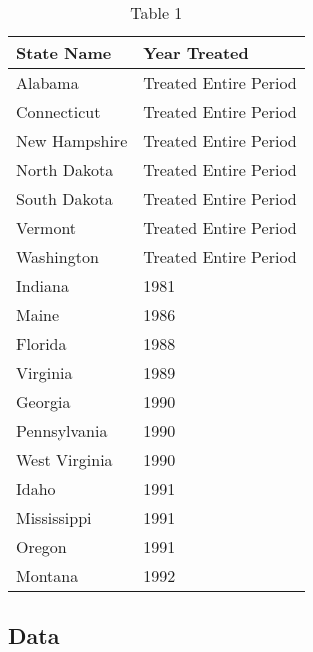 \documentclass[
]{article}
\begin{document}
\begin{table}

\caption{\label{tab:unnamed-chunk-3}Table 1}
\centering
\begin{tabular}[t]{l|l}
\hline
State Name & Year Treated\\
\hline
Alabama & Treated Entire Period\\
\hline
Connecticut & Treated Entire Period\\
\hline
New Hampshire & Treated Entire Period\\
\hline
North Dakota & Treated Entire Period\\
\hline
South Dakota & Treated Entire Period\\
\hline
Vermont & Treated Entire Period\\
\hline
Washington & Treated Entire Period\\
\hline
Indiana & 1981\\
\hline
Maine & 1986\\
\hline
Florida & 1988\\
\hline
Virginia & 1989\\
\hline
Georgia & 1990\\
\hline
Pennsylvania & 1990\\
\hline
West Virginia & 1990\\
\hline
Idaho & 1991\\
\hline
Mississippi & 1991\\
\hline
Oregon & 1991\\
\hline
Montana & 1992\\
\hline
\end{tabular}
\end{table}

\hypertarget{data}{%
\subsection{Data}\label{data}}
\end{document}
